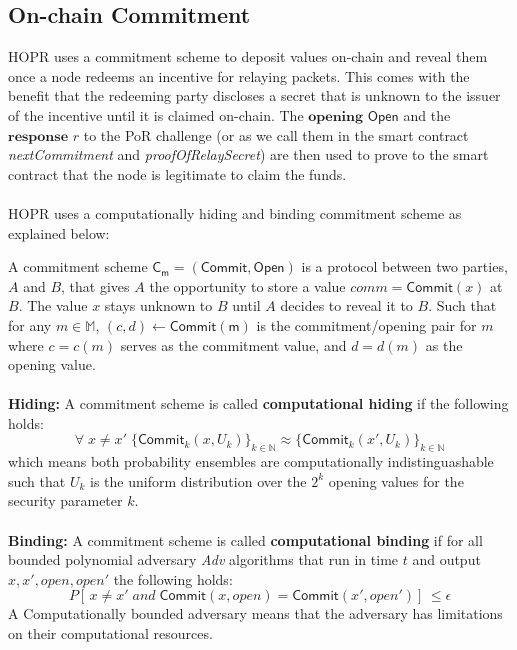 \subsection{On-chain Commitment}
\label{sec:onchaincommitment}

HOPR uses a commitment scheme to deposit values on-chain and reveal them once a
node redeems an incentive for relaying packets. This comes with the benefit that
the redeeming party discloses a secret that is unknown to the issuer of the
incentive until it is claimed on-chain. The $\textbf{opening}$ $\mathsf{Open}$
and the $\textbf{response}$ $r$ to the PoR challenge (or as we call them in the
smart contract \textit{nextCommitment} and \textit{proofOfRelaySecret}) are then
used to prove to the smart contract that the node is legitimate to claim the
funds. \\~\\HOPR uses a computationally hiding and binding commitment scheme as
explained below:

\begin{defnsub}
    A commitment scheme $\mathsf{C_m} = (\mathsf{Commit}, \mathsf{Open})$ is a protocol between two parties, $A$ and $B$, that gives $A$ the opportunity to store a value $comm = \mathsf{Commit}(x)$ at $B$. The value $x$ stays unknown to $B$ until $A$ decides to reveal it to $B$.
    Such that for any $m\in \mathbb{M}$, $(c,d)\leftarrow \mathsf{Commit(m)}$ is the commitment/opening pair for $m$ where $c = c(m)$ serves as the commitment value, and $d = d(m)$ as the opening value.
    \\~\\ \noindent\textbf{Hiding:} A commitment scheme is called \textbf{computational hiding} if the following holds:
    $$\forall \;x\neq x' \; \{\mathsf{Commit}_k(x,U_k)\}_{k\in\mathbb{N}}\approx\{{\mathsf{Commit}_k(x',U_k)}\}_{k\in\mathbb{N}}$$ which means both probability ensembles are computationally indistinguashable such that $U_{k}$ is the uniform distribution over the $2^{k}$ opening values for the security parameter $k$.
    \\~\\\noindent\textbf{Binding:} A commitment scheme is called \textbf{computational binding} if for all bounded polynomial adversary \textit{Adv} algorithms that run in time $t$ and output $x,x',open,open'$ the following holds:
    $$P	[ \,x\neq x' \; and \; \mathsf{Commit}(x,open)={\mathsf{Commit}(x',open')}] \,\leq \epsilon$$ A Computationally bounded adversary means that the adversary has limitations on their computational resources. 

\end{defnsub}

